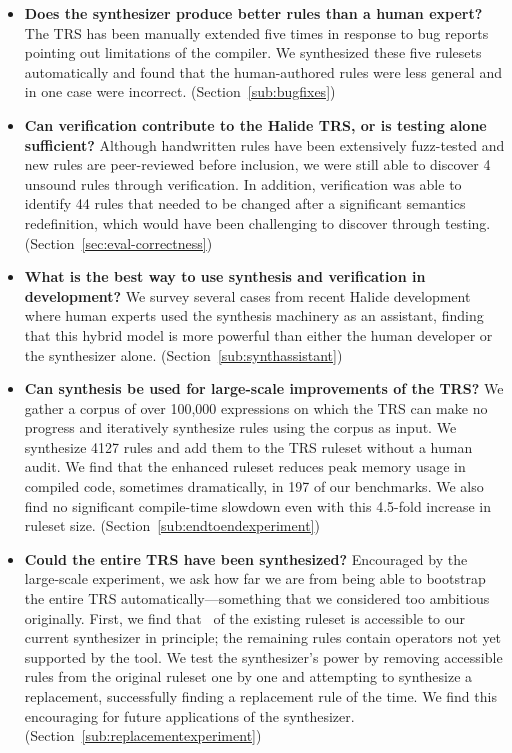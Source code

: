 \documentclass[acmsmall]{acmart}\settopmatter{}
\newcommand{\NumRulesFixed}{{\color{black} 4}\xspace}
\newcommand{\NumRulesSynthesized}{{\color{black} 4127}\xspace}
\newcommand{\NumZdivFalseRules}{{\color{black} 44}\xspace}
\begin{document}
\begin{itemize}
  \item \textbf{Does the synthesizer produce better rules than a human expert?} The TRS has been manually extended five times in response to bug reports pointing out limitations of the compiler. We synthesized these five rulesets automatically and found that the human-authored rules were less general and in one case were incorrect. (Section~\ref{sub:bugfixes})
  \item \textbf{Can verification contribute to the Halide TRS, or is testing alone sufficient?} Although handwritten rules have been extensively fuzz-tested and new rules are peer-reviewed before inclusion, we were still able to discover \NumRulesFixed unsound rules through verification. In addition, verification was able to identify \NumZdivFalseRules rules that needed to be changed after a significant semantics redefinition, which would have been challenging to discover through testing. (Section~\ref{sec:eval-correctness})
  \item \textbf{What is the best way to use synthesis and verification in development?} We survey several cases from recent Halide development where human experts used the synthesis machinery as an assistant, finding that this hybrid model is more powerful than either the human developer or the synthesizer alone. (Section~\ref{sub:synthassistant})
  \item \textbf{Can synthesis be used for large-scale improvements of the TRS?} We gather a corpus of over 100,000 expressions on which the TRS can make no progress and iteratively synthesize rules using the corpus as input. We synthesize \NumRulesSynthesized  rules and add them to the TRS ruleset without a human audit. We find that the enhanced ruleset reduces peak memory usage in compiled code, sometimes dramatically, in 197 of our benchmarks. We also find no significant compile-time slowdown even with this 4.5-fold increase in ruleset size. (Section~\ref{sub:endtoendexperiment})
  \item \textbf{Could the entire TRS have been synthesized?} Encouraged by the large-scale experiment, we ask how far we are from being able to bootstrap the entire TRS automatically---something that we considered too ambitious originally. First, we find that \PercentPossibleToSynth~of the existing ruleset is accessible to our current synthesizer in principle; the remaining rules contain operators not yet supported by the tool. %
  We test the synthesizer's power by removing \NumRulesInCorrectnessExperiment{} accessible rules from the original ruleset one by one and attempting to synthesize a replacement, successfully finding a replacement rule \PercentRulesResynthesized{} of the time.  We find this encouraging for future applications of the synthesizer. (Section~\ref{sub:replacementexperiment})
\end{itemize}
\end{document}
